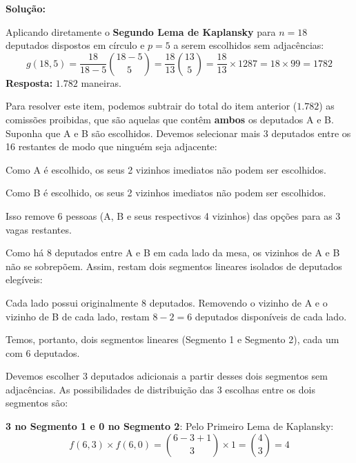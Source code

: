 \documentclass[a4paper,10pt,landscape,twocolumn]{article}  %
\let\oldenumerate\enumerate
\let\oldendenumerate\endenumerate
\renewenvironment{enumerate}{%
  \oldenumerate%
  \setlength{\itemsep}{1pt}%
  \setlength{\parskip}{0pt}%
  \setlength{\parsep}{0pt}%
  \setlength{\topsep}{2pt}%
  \setlength{\partopsep}{0pt}%
}{%
  \oldendenumerate%
}
\let\olditemize\itemize
\let\oldenditemize\enditemize
\renewenvironment{itemize}{%
  \olditemize%
  \setlength{\itemsep}{1pt}%
  \setlength{\parskip}{0pt}%
  \setlength{\parsep}{0pt}%
  \setlength{\topsep}{2pt}%
  \setlength{\partopsep}{0pt}%
}{%
  \oldenditemize%
}
\begin{document}
\begin{enumerate}
    \textbf{Solução:}
    
    \begin{enumerate}
        \item Aplicando diretamente o \textbf{Segundo Lema de Kaplansky} para $n = 18$ deputados dispostos em círculo e $p = 5$ a serem escolhidos sem adjacências:
        \[ g(18, 5) = \frac{18}{18-5} \binom{18-5}{5} = \frac{18}{13} \binom{13}{5} = \frac{18}{13} \times 1287 = 18 \times 99 = 1782 \]
        \textbf{Resposta:} $1.782$ maneiras.
        
        \item Para resolver este item, podemos subtrair do total do item anterior ($1.782$) as comissões proibidas, que são aquelas que contêm \textbf{ambos} os deputados A e B.
        Suponha que A e B são escolhidos. Devemos selecionar mais 3 deputados entre os 16 restantes de modo que ninguém seja adjacente:
        \begin{itemize}
            \item Como A é escolhido, os seus 2 vizinhos imediatos não podem ser escolhidos.
            \item Como B é escolhido, os seus 2 vizinhos imediatos não podem ser escolhidos.
            \item Isso remove 6 pessoas (A, B e seus respectivos 4 vizinhos) das opções para as 3 vagas restantes.
            \item Como há 8 deputados entre A e B em cada lado da mesa, os vizinhos de A e B não se sobrepõem. Assim, restam dois segmentos lineares isolados de deputados elegíveis:
            \begin{itemize}
                \item Cada lado possui originalmente 8 deputados. Removendo o vizinho de A e o vizinho de B de cada lado, restam $8 - 2 = 6$ deputados disponíveis de cada lado.
                \item Temos, portanto, dois segmentos lineares (Segmento 1 e Segmento 2), cada um com 6 deputados.
            \end{itemize}
            \item Devemos escolher 3 deputados adicionais a partir desses dois segmentos sem adjacências. As possibilidades de distribuição das 3 escolhas entre os dois segmentos são:
            \begin{itemize}
                \item \textbf{3 no Segmento 1 e 0 no Segmento 2}: Pelo Primeiro Lema de Kaplansky:
                \[ f(6, 3) \times f(6, 0) = \binom{6-3+1}{3} \times 1 = \binom{4}{3} = 4 \]

\end{itemize}
\end{itemize}
\end{enumerate}
\end{enumerate}
\end{document}
